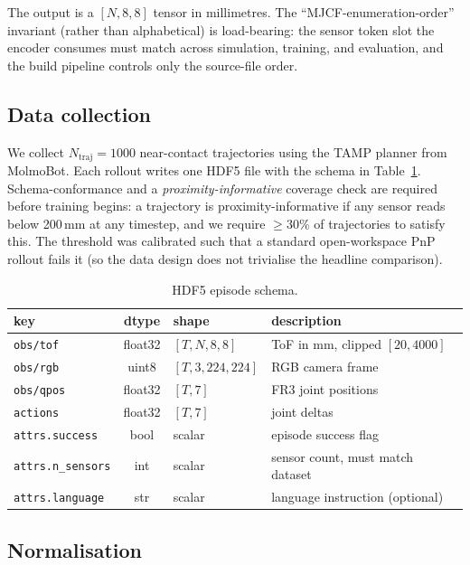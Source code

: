 \documentclass[11pt]{article}
\begin{document}
The output is a $[N, 8, 8]$ tensor in millimetres. The
``MJCF-enumeration-order'' invariant (rather than alphabetical) is
load-bearing: the sensor token slot the encoder consumes must match
across simulation, training, and evaluation, and the build pipeline
controls only the source-file order.

\subsection{Data collection}
\label{sec:system-data}

We collect $N_\mathrm{traj} = 1000$ near-contact trajectories using the
TAMP planner from MolmoBot. Each rollout writes one HDF5 file with the
schema in Table~\ref{tab:hdf5-schema}. Schema-conformance and a
\emph{proximity-informative} coverage check are required before training
begins: a trajectory is proximity-informative if any sensor reads below
200\,mm at any timestep, and we require $\geq 30\%$ of trajectories to
satisfy this. The threshold was calibrated such that a standard
open-workspace PnP rollout fails it (so the data design does not
trivialise the headline comparison).

\begin{table}[t]
\centering
\caption{HDF5 episode schema.}
\label{tab:hdf5-schema}
\small
\begin{tabular}{lcll}
\toprule
key & dtype & shape & description \\
\midrule
\verb|obs/tof|   & float32 & $[T, N, 8, 8]$       & ToF in mm, clipped $[20, 4000]$ \\
\verb|obs/rgb|   & uint8   & $[T, 3, 224, 224]$    & RGB camera frame \\
\verb|obs/qpos|  & float32 & $[T, 7]$              & FR3 joint positions \\
\verb|actions|   & float32 & $[T, 7]$              & joint deltas \\
\verb|attrs.success| & bool & scalar & episode success flag \\
\verb|attrs.n_sensors| & int & scalar & sensor count, must match dataset \\
\verb|attrs.language| & str & scalar & language instruction (optional) \\
\bottomrule
\end{tabular}
\end{table}

\subsection{Normalisation}
\end{document}
